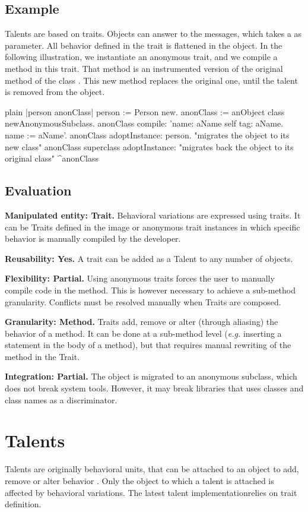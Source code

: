 \documentclass[10pt,twoside,english]{_support/latex/sbabook/sbabook}
\begin{document}
\section{Example}
Talents are based on traits. Objects can answer to the  messages, which takes a  as parameter. All behavior defined in the trait is flattened in the object. In the following illustration, we instantiate an anonymous trait, and we compile a method in this trait. That method is an instrumented version of the original  method of the class . This new method replaces the original one, until the talent is removed from the object.

\begin{displaycode}{plain}
|person anonClass|
  person := Person new.
	anonClass := anObject class newAnonymousSubclass.
	anonClass
		compile:
			'name: aName
				self tag: aName.
				name := aName'.
	anonClass adoptInstance: person. "migrates the object to its new class"
  anonClass superclass adoptInstance: "migrates back the object to its original class"
	^anonClass
\end{displaycode}
\section{Evaluation}
\textbf{Manipulated entity: Trait.} Behavioral variations are expressed using traits. It can be Traits defined in the image or anonymous trait instances in which specific behavior is manually compiled by the developer.

\textbf{Reusability: Yes.} A trait can be added as a Talent to any number of objects.

\textbf{Flexibility: Partial.} Using anonymous traits forces the user to manually compile code in the method. This is however necessary to achieve a sub-method granularity. Conflicts must be resolved manually when Traits are composed.

\textbf{Granularity: Method.} Traits add, remove or alter (through aliasing) the behavior of a method. It can be done at a sub-method level (\textit{e.g.} inserting a statement in the body of a method), but that requires manual rewriting of the method in the Trait.

\textbf{Integration: Partial.} The object is migrated to an anonymous subclass, which does not break system tools. However, it may break libraries that uses classes and class names as a discriminator.

\chapter{Talents}
Talents are originally behavioral units, that can be attached to an object to add, remove or alter behavior \cite{ressia2014talents}. Only the object to which a talent is attached is affected by behavioral variations. The latest talent implementationrelies on trait definition.
\end{document}

